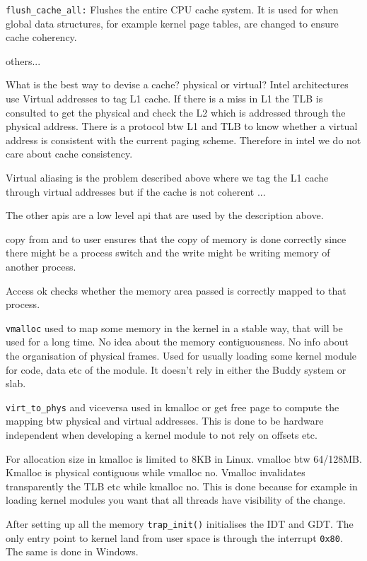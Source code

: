 \documentclass[twoside]{article}
\begin{document}
\begin{description}
    \item \texttt{flush_cache_all:} Flushes the entire CPU cache system. It is used for when global data structures, for example kernel page tables, are changed to ensure cache coherency.
    \item others...
\end{description}

What is the best way to devise a cache? physical or virtual? Intel architectures use Virtual addresses to tag L1 cache. If there is a miss in L1 the TLB is consulted to get the physical and check the L2 which is addressed through the physical address. There is a protocol btw L1 and TLB to know whether a virtual address is consistent with the current paging scheme. Therefore in intel we do not care about cache consistency.

Virtual aliasing is the problem described above where we tag the L1 cache through virtual addresses but if the cache is not coherent ...

The other apis are a low level api that are used by the description above.

copy from and to user ensures that the copy of memory is done correctly since there might be a process switch and the write might be writing memory of another process.

Access ok checks whether the memory area passed is correctly mapped to that process. 

\texttt{vmalloc} used to map some memory in the kernel in a stable way, that will be used for a long time. No idea about the memory contiguousness. No info about the organisation of physical frames. Used for usually loading some kernel module for code, data etc of the module. It doesn't rely in either the Buddy system or slab. 

\texttt{virt_to_phys} and viceversa used in kmalloc or get free page to compute the mapping btw physical and virtual addresses. This is done to be hardware independent when developing a kernel module to not rely on offsets etc. 

For allocation size in kmalloc is limited to 8KB in Linux. vmalloc btw 64/128MB. Kmalloc is physical contiguous while vmalloc no. Vmalloc invalidates transparently the TLB etc while kmalloc no. This is done because for example in loading kernel modules you want that all threads have visibility of the change. 

After setting up all the memory \texttt{trap\_init()} initialises the IDT and GDT.
The only entry point to kernel land from user space is through the interrupt \texttt{0x80}. The same is done in Windows.
\end{document}
